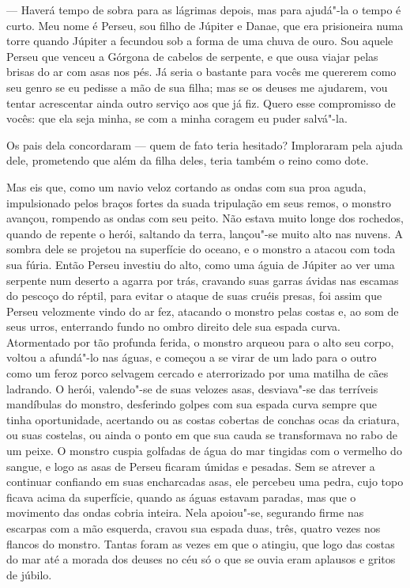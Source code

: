--- Haverá tempo de sobra para as lágrimas depois, mas para ajudá"-la o
tempo é curto. Meu nome é Perseu, sou filho de Júpiter e Danae,
que era prisioneira numa torre quando Júpiter a fecundou sob a forma
de uma chuva de ouro. Sou aquele Perseu que venceu a Górgona de
cabelos de serpente, e que ousa viajar pelas brisas do ar com asas nos
pés. Já seria o bastante para vocês me quererem como seu genro
se eu pedisse a mão de sua filha; mas se os deuses me ajudarem, vou
tentar acrescentar ainda outro serviço aos que já fiz. Quero esse
compromisso de vocês: que ela seja minha, se com a minha coragem eu
puder salvá"-la.

Os pais dela concordaram --- quem de fato teria hesitado? Imploraram
pela ajuda dele, prometendo que além da filha deles, teria também o
reino como dote. 

Mas eis que, como um navio veloz cortando as ondas com sua proa aguda,
impulsionado pelos braços fortes da suada tripulação em seus remos, o
monstro avançou, rompendo as ondas com seu peito. Não estava muito
longe dos rochedos, quando de repente o herói, saltando da terra, lançou"-se
muito alto nas nuvens. A sombra dele se projetou na superfície do
oceano, e o monstro a atacou com toda sua fúria. Então Perseu
investiu do alto, como uma águia de Júpiter ao ver uma
serpente num deserto a agarra por trás, cravando suas
garras ávidas nas escamas do pescoço do réptil, para evitar o ataque
de suas cruéis presas, foi assim que Perseu velozmente vindo do ar fez,
atacando o monstro pelas costas e, ao som de seus urros, enterrando
fundo no ombro direito dele sua espada curva. Atormentado por tão
profunda ferida, o monstro arqueou para o alto seu corpo, voltou a
afundá"-lo nas águas, e começou a se virar de um lado para o outro
como um feroz porco selvagem cercado e aterrorizado por uma matilha
de cães ladrando. O herói, valendo"-se de suas velozes asas,
desviava"-se das terríveis mandíbulas do monstro, desferindo golpes
com sua espada curva sempre que tinha oportunidade, acertando ou as
costas cobertas de conchas ocas da criatura, ou suas costelas, ou
ainda o ponto em que sua cauda se transformava no rabo de um peixe.
O monstro cuspia golfadas de água do mar tingidas com o
vermelho do sangue, e logo as asas de Perseu ficaram úmidas e pesadas.
Sem se atrever a continuar confiando em suas encharcadas
asas, ele percebeu uma pedra, cujo topo ficava acima da superfície,
quando as águas estavam paradas, mas que o movimento das ondas cobria
inteira. Nela apoiou"-se, segurando firme nas escarpas com a mão
esquerda, cravou sua espada duas, três, quatro vezes nos
flancos do monstro. Tantas foram as vezes em que o
atingiu, que logo das costas do mar até a morada dos deuses no céu só
o que se ouvia eram aplausos e gritos de júbilo.

